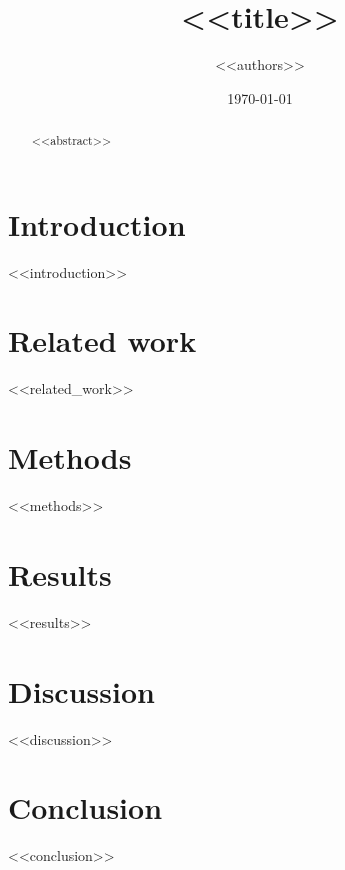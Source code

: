 \documentclass[11pt,a4paper]{article}
\title{<<title>>}
\author{<<authors>>}
\date{\today}
\begin{document}
\maketitle

\begin{abstract}
<<abstract>>
\end{abstract}

\section{Introduction}
<<introduction>>

\section{Related work}
<<related_work>>

\section{Methods}
<<methods>>

\section{Results}
<<results>>

\section{Discussion}
<<discussion>>

\section{Conclusion}
<<conclusion>>



\end{document}
